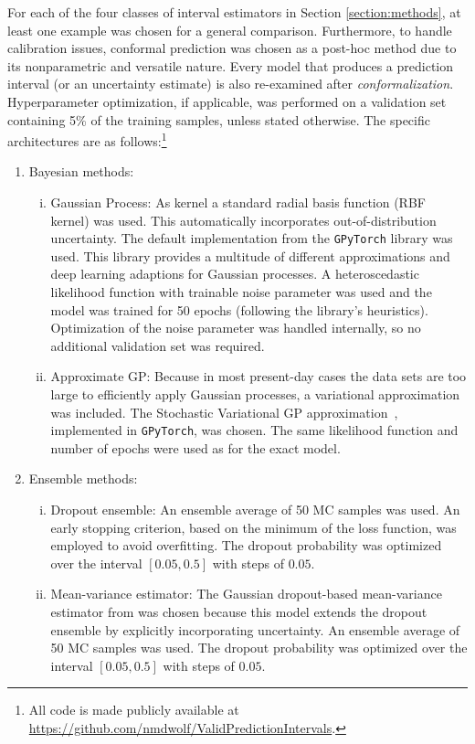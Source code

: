 \documentclass[smallcondensed]{svjour3}
\begin{document}
    For each of the four classes of interval estimators in Section \ref{section:methods}, at least one example was chosen for a general comparison. Furthermore, to handle calibration issues, conformal prediction was chosen as a post-hoc method due to its nonparametric and versatile nature. Every model that produces a prediction interval (or an uncertainty estimate) is also re-examined after \textit{conformalization}. Hyperparameter optimization, if applicable, was performed on a validation set containing 5\% of the training samples, unless stated otherwise. The specific architectures are as follows:\footnote{All code is made publicly available at \url{https://github.com/nmdwolf/ValidPredictionIntervals}.}
    \begin{enumerate}
        \item Bayesian methods:
        \begin{enumerate}[(i)]
            \item Gaussian Process: As kernel a standard radial basis function (RBF kernel) was used. This automatically incorporates out-of-distribution uncertainty. The default implementation from the \texttt{GPyTorch} library \cite{gardner2018gpytorch} was used. This library provides a multitude of different approximations and deep learning adaptions for Gaussian processes. A heteroscedastic likelihood function with trainable noise parameter was used and the model was trained for 50 epochs (following the library's heuristics). Optimization of the noise parameter was handled internally, so no additional validation set was required.
            \item Approximate GP: Because in most present-day cases the data sets are too large to efficiently apply Gaussian processes, a variational approximation was included. The Stochastic Variational GP approximation~\cite{hensman2015scalable}, implemented in \texttt{GPyTorch}, was chosen. The same likelihood function and number of epochs were used as for the exact model.
        \end{enumerate}
        \item Ensemble methods:
        \begin{enumerate}[(i)]
            \item Dropout ensemble: An ensemble average of 50 MC samples was used. An early stopping criterion, based on the minimum of the loss function, was employed to avoid overfitting. The dropout probability was optimized over the interval $[0.05,0.5]$ with steps of $0.05$.
            \item Mean-variance estimator: The Gaussian dropout-based mean-variance estimator from \cite{kendallgal} was chosen because this model extends the dropout ensemble by explicitly incorporating uncertainty. An ensemble average of 50 MC samples was used. The dropout probability was optimized over the interval $[0.05,0.5]$ with steps of $0.05$.

\end{enumerate}
\end{enumerate}
\end{document}
